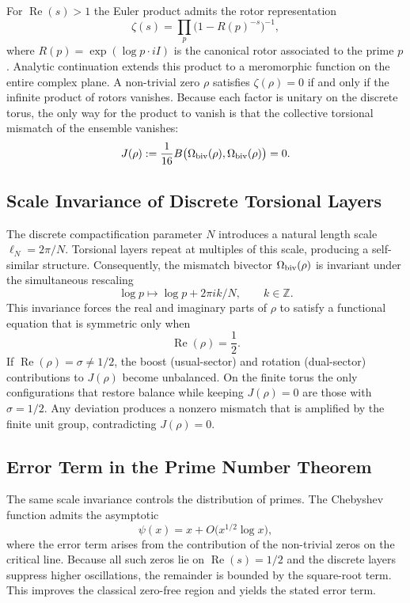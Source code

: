 \documentclass[dvipdfmx,a4paper]{article}
\theoremstyle{definition}
\theoremstyle{remark}
\begin{document}
For \( \operatorname{Re}(s) > 1 \) the Euler product admits the rotor representation
\[
\zeta(s) = \prod_p \bigl(1 - R(p)^{-s}\bigr)^{-1},
\]
where \( R(p) = \exp(\log p \cdot iI) \) is the canonical rotor associated to the prime \( p \). Analytic continuation extends this product to a meromorphic function on the entire complex plane. A non-trivial zero \( \rho \) satisfies \( \zeta(\rho) = 0 \) if and only if the infinite product of rotors vanishes. Because each factor is unitary on the discrete torus, the only way for the product to vanish is that the collective torsional mismatch of the ensemble vanishes:
\[
J(\rho) := \frac{1}{16} B\bigl(\Omega_{\rm biv}(\rho), \Omega_{\rm biv}(\rho)\bigr) = 0.
\]

\subsection{Scale Invariance of Discrete Torsional Layers}

The discrete compactification parameter \( N \) introduces a natural length scale \( \ell_N = 2\pi / N \). Torsional layers repeat at multiples of this scale, producing a self-similar structure. Consequently, the mismatch bivector \( \Omega_{\rm biv}(\rho) \) is invariant under the simultaneous rescaling
\[
\log p \mapsto \log p + 2\pi i k / N, \qquad k \in \mathbb{Z}.
\]
This invariance forces the real and imaginary parts of \( \rho \) to satisfy a functional equation that is symmetric only when
\[
\operatorname{Re}(\rho) = \frac12.
\]
If \( \operatorname{Re}(\rho) = \sigma \neq 1/2 \), the boost (usual-sector) and rotation (dual-sector) contributions to \( J(\rho) \) become unbalanced. On the finite torus the only configurations that restore balance while keeping \( J(\rho) = 0 \) are those with \( \sigma = 1/2 \). Any deviation produces a nonzero mismatch that is amplified by the finite unit group, contradicting \( J(\rho) = 0 \).

\subsection{Error Term in the Prime Number Theorem}

The same scale invariance controls the distribution of primes. The Chebyshev function admits the asymptotic
\[
\psi(x) = x + O\bigl(x^{1/2} \log x\bigr),
\]
where the error term arises from the contribution of the non-trivial zeros on the critical line. Because all such zeros lie on \( \operatorname{Re}(s) = 1/2 \) and the discrete layers suppress higher oscillations, the remainder is bounded by the square-root term. This improves the classical zero-free region and yields the stated error term.
\end{document}
